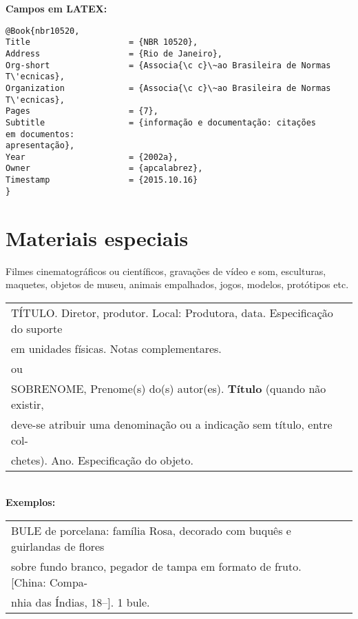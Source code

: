\textbf{Campos em LATEX:} 

\begin{verbatim}
@Book{nbr10520,
Title                    = {NBR 10520},
Address                  = {Rio de Janeiro},
Org-short                = {Associa{\c c}\~ao Brasileira de Normas 
T\'ecnicas},
Organization             = {Associa{\c c}\~ao Brasileira de Normas 
T\'ecnicas},
Pages                    = {7},
Subtitle                 = {informação e documentação: citações 
em documentos: 
apresentação},
Year                     = {2002a},
Owner                    = {apcalabrez},
Timestamp                = {2015.10.16}
}
\end{verbatim}


\section{Materiais especiais}

Filmes cinematográficos ou científicos, gravações de vídeo e som,
esculturas, maquetes, objetos de museu, animais empalhados, jogos,
modelos, protótipos etc. \\

\begin{tabular}{|l|c|} \hline
	TÍTULO. Diretor, produtor. Local: Produtora, data. Especificação do	suporte\\
	em unidades físicas. Notas complementares. \\
	
	ou\\	
	
	SOBRENOME, Prenome(s) do(s) autor(es). \textbf{Título} (quando não 	existir,\\
	deve-se atribuir uma denominação ou a indicação sem 	título, entre col-\\
	chetes). Ano. Especificação do objeto. 
	\\\hline
\end{tabular} \\

\textbf{Exemplos:} \\

\begin{tabular}{|l|c|} \hline
	BULE de porcelana: família Rosa, decorado com buquês e guirlandas de flores\\ 
	sobre fundo branco, pegador de tampa em formato de fruto. [China: Compa-\\
	nhia das Índias, 18--]. 1 bule.  
	\\\hline
\end{tabular} \\

